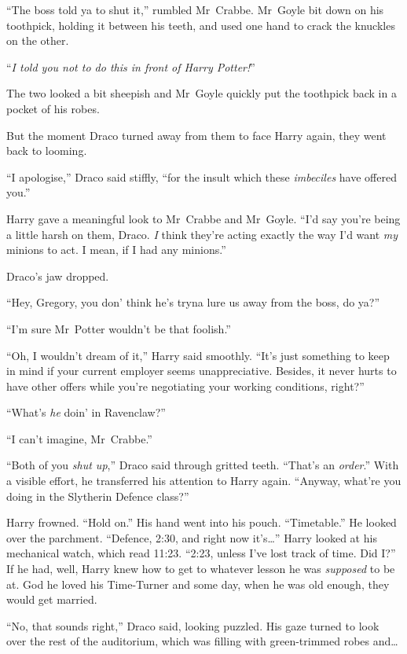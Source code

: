 “The boss told ya to shut it,” rumbled Mr~Crabbe. Mr~Goyle bit down on his toothpick, holding it between his teeth, and used one hand to crack the knuckles on the other.

“\emph{I told you not to do this in front of Harry Potter!}”

The two looked a bit sheepish and Mr~Goyle quickly put the toothpick back in a pocket of his robes.

But the moment Draco turned away from them to face Harry again, they went back to looming.

“I apologise,” Draco said stiffly, “for the insult which these \emph{imbeciles} have offered you.”

Harry gave a meaningful look to Mr~Crabbe and Mr~Goyle. “I’d say you’re being a little harsh on them, Draco. \emph{I} think they’re acting exactly the way I’d want \emph{my} minions to act. I mean, if I had any minions.”

Draco’s jaw dropped.

“Hey, Gregory, you don’ think he’s tryna lure us away from the boss, do ya?”

“I’m sure Mr~Potter wouldn’t be that foolish.”

“Oh, I wouldn’t dream of it,” Harry said smoothly. “It’s just something to keep in mind if your current employer seems unappreciative. Besides, it never hurts to have other offers while you’re negotiating your working conditions, right?”

“What’s \emph{he} doin’ in Ravenclaw?”

“I can’t imagine, Mr~Crabbe.”

“Both of you \emph{shut up},” Draco said through gritted teeth. “That’s an \emph{order}.” With a visible effort, he transferred his attention to Harry again. “Anyway, what’re you doing in the Slytherin Defence class?”

Harry frowned. “Hold on.” His hand went into his pouch. “Timetable.” He looked over the parchment. “Defence, 2:30\pm, and right now it’s…” Harry looked at his mechanical watch, which read 11:23. “2:23, unless I’ve lost track of time. Did I?” If he had, well, Harry knew how to get to whatever lesson he was \emph{supposed} to be at. God he loved his Time-Turner and some day, when he was old enough, they would get married.

“No, that sounds right,” Draco said, looking puzzled. His gaze turned to look over the rest of the auditorium, which was filling with green-trimmed robes and…


